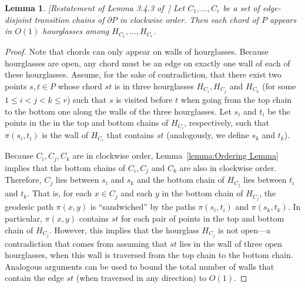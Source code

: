 \documentclass[a4paper]{article}
\newtheorem{lemma}[theorem]{Lemma}
\newcommand{\p}[2]{\ensuremath{\pi(#1, #2)}}
\begin{document}
\begin{lemma}\label{lemma:Edges appear a constant number of times}
[Restatement of Lemma 3.4.3 of~\cite{aronov1993furthest}]
Let $C_1, \ldots, C_r$ be a set of edge-disjoint transition chains of $\partial P$ in clockwise order. Then each chord of $P$ appears in $O(1)$ hourglasses among $H_{C_1}, \ldots, H_{C_r}$.
\end{lemma}
\begin{proof}
Note that chords can only appear on walls of hourglasses. Because  hourglasses are open, any chord must be an edge on exactly one wall of each of these hourglasses. Assume, for the sake of contradiction, that there exist two points $s,t\in P$ whose chord $st$ is in three hourglasses $H_{C_i}, H_{C_j}$ and $H_{C_k}$ (for some $1\leq i < j < k\leq r$) such that $s$ is visited before $t$ when going from the top chain to the bottom one along the walls of the three hourglasses.
Let $s_i$ and $t_i$ be the points in the in the top and bottom chains of $H_{C_i}$, respectively, such that $\p{s_i}{t_i}$ is the wall of $H_{C_i}$ that contains $st$ (analogously, we define $s_k$ and $t_k$).

Because $C_i, C_j, C_k$ are in clockwise order, Lemma~\ref{lemma:Ordering Lemma} implies that the bottom chains of $C_i, C_j$ and $C_k$ are also in clockwise order. Therefore, $C_j$ lies between $s_i$ and $s_k$ and the bottom chain of $H_{C_j}$ lies between $t_i$ and $t_k$. 
That is, for each $x\in C_j$ and each $y$ in the bottom chain of $H_{C_j}$, the geodesic path $\p{x}{y}$ is ``sandwiched'' by the paths $\p{s_i}{t_i}$ and $\p{s_k}{t_k}$.
In particular, $\p{x}{y}$ contains $st$ for each pair of points in the top and bottom chain of $H_{C_j}$.
However, this implies that the hourglass $H_{C_j}$ is not open---a contradiction that comes from assuming that $st$ lies in the  wall of three open hourglasses, when this wall is traversed from the top chain to the bottom chain. 
Analogous arguments can be used to bound the total number of walls that contain the edge $st$ (when traversed in any direction) to $O(1)$.
\end{proof}

\end{document}

